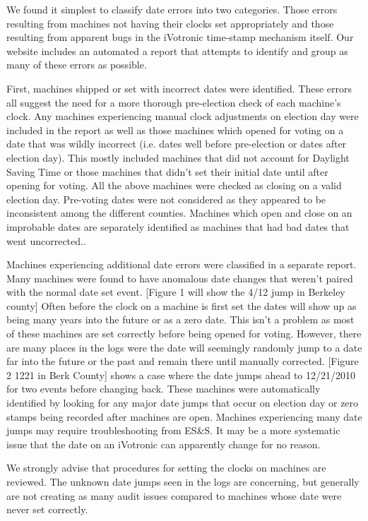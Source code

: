 We found it simplest to classify date errors into two categories.  Those errors resulting from machines not having their clocks set appropriately and those resulting from apparent bugs in the iVotronic time-stamp mechanism itself.  Our website includes an automated a report that attempts to identify and group as many of these errors as possible.

First, machines shipped or set with incorrect dates were identified.  These errors all suggest the need for a more thorough pre-election check of each machine's clock.   Any machines experiencing manual clock adjustments on election day were included in the report as well as those machines which opened for voting on a date that was wildly incorrect (i.e. dates well before pre-election or dates after election day). This mostly included machines that did not account for Daylight Saving Time or  those machines that didn't set their initial date until after opening for voting.  All the above machines were checked as closing on a valid election day.  Pre-voting dates were not considered as they appeared to be inconsistent among the different counties. Machines which open and close on an improbable dates are separately identified as machines that had bad dates that went uncorrected..  

Machines experiencing additional date errors were classified in a separate report.  Many machines were found to have anomalous date changes that weren't paired with the normal date set event. [Figure 1 will show the 4/12 jump in Berkeley county] Often before the clock on a machine is first set the dates will show up as being many years into the future or as a zero date.  This isn't a problem as most  of these machines are set correctly before being opened for voting.  However, there are many places in the logs were the date will seemingly randomly jump to a date far into the future or the past and remain there until manually corrected.  [Figure 2 12\/21 in Berk County] shows a case where the date jumps ahead to 12/21/2010 for two events before changing back.  These machines were automatically identified by looking for any major date jumps that occur on election day or zero stamps being recorded after machines are open. Machines experiencing many date jumps may require troubleshooting from ES\&S.  It may be a more systematic issue that the date on an iVotronic can apparently change for no reason.

We strongly advise that procedures for setting the clocks on machines are reviewed.  The unknown date jumps seen in the logs are concerning, but generally are not creating as many audit issues compared to machines whose date were never set correctly.

